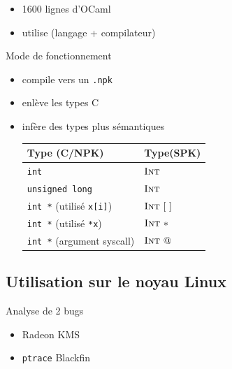 \documentclass{beamer}
\begin{document}
\begin{frame}

\begin{itemize}
\item 1600 lignes d'OCaml
\item utilise \newspeak (langage + compilateur)
\end{itemize}

\end{frame}

\begin{frame}{Mode de fonctionnement}

  \begin{itemize}
  \item compile vers un \texttt{.npk}
  \item enlève les types C
  \item infère des types plus sémantiques

      \begin{tabular}{ll}
          \toprule
          Type (C/NPK) & Type(SPK) \\
          \midrule
          \texttt{int} & $\textsc{Int}$ \\
          \texttt{unsigned long} & $\textsc{Int}$ \\
          \texttt{int *} (utilisé \texttt{x[i]}) & $\textsc{Int}~[~]$ \\
          \texttt{int *} (utilisé \texttt{*x}) & $\textsc{Int}~*$ \\
          \texttt{int *} (argument syscall) & $\textsc{Int}~@$ \\
          \bottomrule
      \end{tabular}
  \end{itemize}

\end{frame}

\begin{frame}  \end{frame}
\begin{frame}  \end{frame}
\begin{frame}  \end{frame}

\subsection{Utilisation sur le noyau Linux}

\begin{frame}{Analyse de 2 bugs}

    \begin{itemize}
        \item Radeon KMS
        \item \texttt{ptrace} Blackfin
    \end{itemize}
\end{frame}
\end{document}
